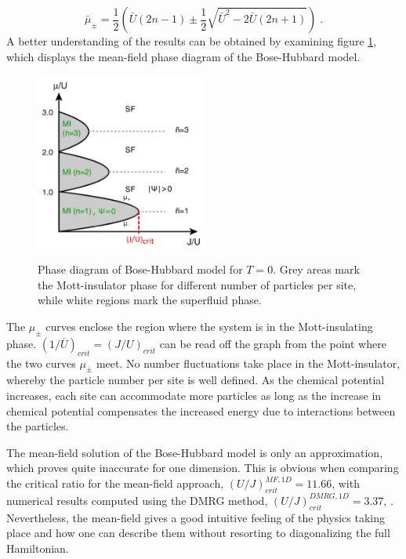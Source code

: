 \begin{equation}
	\bar{\mu}_{\pm} = \frac{1}{2} \left( \bar{U}(2n -1) \pm \frac{1}{2} \sqrt{\bar{U}^2 - 2 \bar{U} (2 n +1)} \right) \; .
\end{equation}
A better understanding of the results can be obtained by examining figure \ref{fig:SFMOTT}, which displays the mean-field phase diagram of the Bose-Hubbard model.  
\begin{figure}[h]
	\centering
	\includegraphics[width = 0.5\textwidth]{Figures/SFMottPhase.pdf}
	\label{fig:SFMOTT}
	\caption{Phase diagram of Bose-Hubbard model for $T = 0$. Grey areas mark the Mott-insulator phase for different number of particles per site, while white regions mark the superfluid phase. \cite{greiner}}
\end{figure}
The $\mu_{\pm}$ curves enclose the region where the system is in the Mott-insulating phase. $(1/\bar{U})_{crit} = (J/U)_{crit}$ can be read off the graph from the point where the two curves $\mu_{\pm}$ meet. No number fluctuations take place in the Mott-insulator, whereby the particle number per site is well defined. As the chemical potential increases, each site can accommodate more particles as long as the increase in chemical potential compensates the increased energy due to interactions between the particles.

The mean-field solution of the Bose-Hubbard model is only an approximation, which proves quite inaccurate for one dimension. This is obvious when comparing the critical ratio for the mean-field approach, $\left( U/J \right)_{crit}^{MF,1D} = 11.66$, with numerical results computed using the DMRG method, $\left( U/J \right)_{crit}^{DMRG,1D} = 3.37$, \cite{Kuhner2000}. Nevertheless, the mean-field gives a good intuitive feeling of the physics taking place and how one can describe them without resorting to diagonalizing the full Hamiltonian.